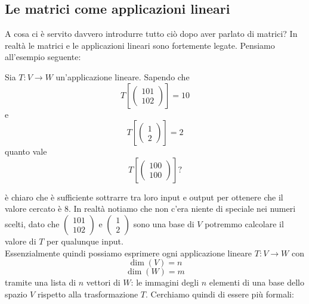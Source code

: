 \documentclass[11pt]{scrartcl}
\begin{document}
 	 \subsection{Le matrici come applicazioni lineari}
 	 
 	 A cosa ci è servito davvero introdurre tutto ciò dopo aver parlato di matrici? In realtà le matrici e le applicazioni lineari sono fortemente legate. Pensiamo all'esempio seguente:
 	 \begin{example}
 	 	Sia $T:V\to W$ un'applicazione lineare. Sapendo che 
 	 	$$T\left[\begin{pmatrix} 101 \\ 102 \end{pmatrix}\right]=10$$ e $$T\left[\begin{pmatrix} 1 \\ 2 \end{pmatrix}\right]=2$$ quanto vale 
 	 	$$T\left[\begin{pmatrix}
 	 		100 \\ 100
 	 	\end{pmatrix}\right]?$$
 	 \end{example}
 	 è chiaro che è sufficiente sottrarre tra loro input e output per ottenere che il valore cercato è $8$. In realtà notiamo che non c'era niente di speciale nei numeri scelti, dato che $\begin{pmatrix} 101 \\ 102 \end{pmatrix}$ e $\begin{pmatrix} 1 \\ 2 \end{pmatrix}$ sono una base di $V$ potremmo calcolare il valore di $T$ per qualunque input.\\ Essenzialmente quindi possiamo esprimere ogni applicazione lineare $T:V\to W$ con 
 	 $$\dim(V)=n$$
 	 $$\dim(W)=m$$
 	 tramite una lista di $n$ vettori di $W$: le immagini degli $n$ elementi di una base dello spazio $V$ rispetto alla trasformazione $T$. Cerchiamo quindi di essere più formali:
\end{document}
